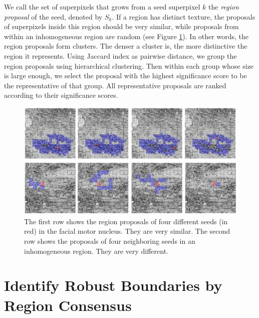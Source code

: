 \documentclass{llncs}
\begin{document}
We call the set of superpixels that grows from a seed superpixel $k$ the \textit{region proposal} of the seed, denoted by $S_k$. If a region has distinct texture, the proposals of superpixels inside this region should be very similar, while proposals from within an inhomogeneous region are random (see Figure \ref{fig:ConsistentProposals}). In other words, the region proposals form clusters. The denser a cluster is, the more distinctive the region it represents. Using Jaccard index as pairwise distance, we group the region proposals using hierarchical clustering. Then within each group whose size is large enough, we select the proposal with the highest significance score to be the representative of that group. All representative proposals are ranked according to their significance scores. 


\begin{figure}
	\includegraphics[width=\textwidth]{../figures/ProposalsGoodAndBad.png}
	\caption{The first row shows the region proposals of four different seeds (in red) in the facial motor nucleus. They are very similar. The second row shows the proposals of four neighboring seeds in an inhomogeneous region. They are very different.} %
	\label{fig:ConsistentProposals}
\end{figure}

 
\section{Identify Robust Boundaries by Region Consensus}
\end{document}
